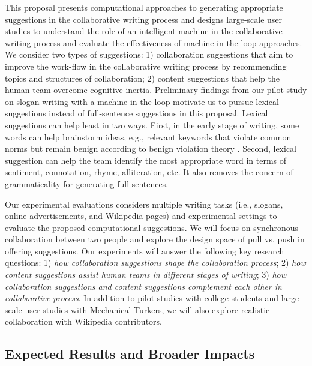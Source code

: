 This proposal presents computational approaches to generating appropriate suggestions in the collaborative writing process and designs large-scale user studies to understand the role of an intelligent machine in the collaborative writing process and evaluate the effectiveness of machine-in-the-loop approaches.
We consider two types of suggestions:
1) collaboration suggestions that aim to improve the work-flow in the collaborative writing process by recommending topics and structures of collaboration;
2) content suggestions that help the human team overcome cognitive inertia.
Preliminary findings from our pilot study on slogan writing with a machine in the loop motivate us to pursue lexical suggestions instead of full-sentence suggestions in this proposal.
Lexical suggestions can help least in two ways.
First, in the early stage of writing, some words can help brainstorm ideas, e.g., relevant keywords that violate common norms but remain benign according to benign violation theory \citep{warren_opinion:_2015}.
Second, lexical suggestion can help the team identify the most appropriate word in terms of sentiment, connotation, rhyme, alliteration, etc.
It also removes the concern of grammaticality for generating full sentences.

Our experimental evaluations considers multiple writing tasks (i.e., slogans, online advertisements, and Wikipedia pages) and experimental settings to evaluate the proposed computational suggestions.
We will focus on synchronous collaboration between two people and explore the design space of pull vs. push in offering suggestions.
Our experiments will answer the following key research questions:
1) {\em how collaboration suggestions shape the collaboration process};
2) {\em how content suggestions assist human teams in different stages of writing};
3) {\em how collaboration suggestions and content suggestions complement each other in collaborative process}.
In addition to pilot studies with college students and large-scale user studies with Mechanical Turkers, we will also explore realistic collaboration with Wikipedia contributors.


\subsection{Expected Results and Broader Impacts}


